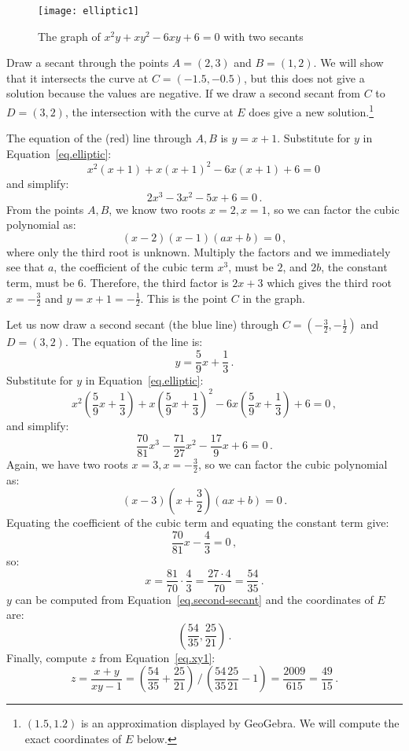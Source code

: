 \begin{figure}[H]
\begin{center}
\texttt{[image: elliptic1]}
\end{center}
\caption{The graph of $x^2y + xy^2 -6xy + 6 = 0$ with two secants}\label{fig.elliptic}
\end{figure}

Draw a secant through the points $A=(2,3)$ and $B=(1,2)$. We will show that it intersects the curve at $C=(-1.5,-0.5)$, but this does not give a solution because the values are negative. If we draw a second secant from $C$ to $D=(3,2)$, the intersection with the curve at $E$ does give a new solution.\footnote{$(1.5,1.2)$ is an approximation displayed by GeoGebra. We will compute the exact coordinates of $E$ below.}

The equation of the (red) line through $A,B$ is $y=x+1$. Substitute for $y$ in Equation~\ref{eq.elliptic}:
\[
x^2(x+1) + x(x+1)^2 -6x(x+1) +6 =0\,
\]
and simplify:
\[
2x^3 -3x^2 -5x +6 =0\,.
\]
From the points $A,B$, we know two roots $x=2,x=1$, so we can factor the cubic polynomial as:
\[
(x-2)(x-1)(ax+b)=0\,,
\]
where only the third root is unknown. Multiply the factors and we immediately see that $a$, the coefficient of the cubic term $x^3$, must be $2$, and $2b$, the constant term, must be $6$. Therefore, the third factor is $2x+3$ which gives the third root $x=-\frac{3}{2}$ and $y=x+1=-\frac{1}{2}$. This is the point $C$ in the graph.

Let us now draw a second secant (the blue line) through $C=(-\frac{3}{2},-\frac{1}{2})$ and $D=(3,2)$. The equation of the line is:
\begin{equation}
y = \frac{5}{9}x + \frac{1}{3}\,.\label{eq.second-secant}
\end{equation}
Substitute for $y$ in Equation~\ref{eq.elliptic}:
\[
x^2\left(\frac{5}{9}x + \frac{1}{3}\right) + x\left(\frac{5}{9}x + \frac{1}{3}\right)^2 -6x\left(\frac{5}{9}x + \frac{1}{3}\right) +6 =0\,,
\]
and simplify:
\[
\frac{70}{81}x^3 - \frac{71}{27}x^2 - \frac{17}{9}x +6 =0\,.
\]
Again, we have two roots $x=3,x=-\frac{3}{2}$, so we can factor the cubic polynomial as:
\[
(x-3)(x+\frac{3}{2})(ax+b)=0\,.
\]
Equating the coefficient of the cubic term and equating the constant term give:
\[
\frac{70}{81}x - \frac{4}{3}=0\,,
\]
so:
\[
x=\frac{81}{70}\cdot \frac{4}{3}= \frac{27\cdot 4}{70} = \frac{54}{35}\,.
\]
$y$ can be computed from Equation~\ref{eq.second-secant} and the coordinates of $E$ are:
\[
\left(\frac{54}{35}, \frac{25}{21}\right)\,.
\]
Finally, compute $z$ from Equation~\ref{eq.xy1}:
\[
z=\frac{x+y}{xy-1}=%
\displaystyle\left(\frac{54}{35} + \frac{25}{21}\right)%
 \, / \,%
\displaystyle\left(\frac{54}{35}\frac{25}{21}-1\right)=%
\frac{2009}{615} = \frac{49}{15}\,.
\]

